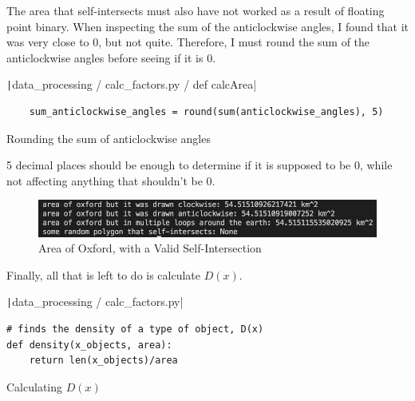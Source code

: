 \documentclass[12pt]{report}
\newcommand{\pil}[1]{\protect\texttt|#1|}
\begin{document}
The area that self-intersects must also have not worked as a result of floating point binary. When inspecting the sum of the anticlockwise angles, I found that it was very close to 0, but not quite. Therefore, I must round the sum of the anticlockwise angles before seeing if it is 0.

\begin{listing}[H]
\pil{data_processing / calc_factors.py / def calcArea}
\begin{verbatim}
    sum_anticlockwise_angles = round(sum(anticlockwise_angles), 5)
\end{verbatim}
\caption{Rounding the sum of anticlockwise angles}\label{cs:dofxRounding}
\end{listing}

5 decimal places should be enough to determine if it is supposed to be 0, while not affecting anything that shouldn't be 0.

\begin{center}
\end{center}

\begin{figure}[H]
\centering
\includegraphics[width=14cm]{ss4.2.png}
\caption{Area of Oxford, with a Valid Self-Intersection}\label{fig:ss4.2}
\end{figure}

Finally, all that is left to do is calculate $D\left(x\right)$.

\begin{listing}[H]
\pil{data_processing / calc_factors.py}
\begin{verbatim}
# finds the density of a type of object, D(x)
def density(x_objects, area):
    return len(x_objects)/area
\end{verbatim}
\caption{Calculating $D\left(x\right)$}\label{cs:dofx}
\end{listing}
\end{document}
